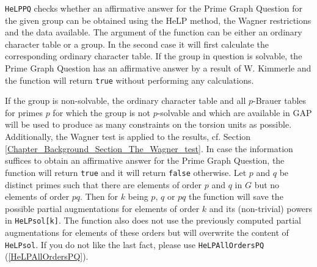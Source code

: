 \documentclass[a4paper,11pt]{report}
\begin{document}
{{{ \texttt{HeLP{\textunderscore}PQ} checks whether an affirmative answer for the Prime Graph Question for the
given group can be obtained using the HeLP method, the Wagner restrictions and
the data available. The argument of the function can be either an ordinary
character table or a group. In the second case it will first calculate the
corresponding ordinary character table. If the group in question is solvable,
the Prime Graph Question has an affirmative answer by a result of W. Kimmerle
and the function will return \texttt{true} without performing any calculations.

 If the group is non-solvable, the ordinary character table and all $p$-Brauer tables for primes $p$ for which the group is not $p$-solvable and which are available in GAP will be used to produce as many
constraints on the torsion units as possible. Additionally, the Wagner test is
applied to the results, cf. Section \ref{Chapter_Background_Section_The_Wagner_test}. In case the information suffices to obtain an affirmative answer for the
Prime Graph Question, the function will return \texttt{true} and it will return \texttt{false} otherwise. Let $p$ and $q$ be distinct primes such that there are elements of order $p$ and $q$ in $G$ but no elements of order $pq$. Then for $k$ being $p$, $q$ or $pq$ the function will save the possible partial augmentations for elements of
order $k$ and its (non-trivial) powers in \texttt{HeLP{\textunderscore}sol[k]}. The function also does not use the previously computed partial augmentations
for elements of these orders but will overwrite the content of \texttt{HeLP{\textunderscore}sol}. If you do not like the last fact, please use \texttt{HeLP{\textunderscore}AllOrdersPQ} (\ref{HeLPAllOrdersPQ}). }

}}
\end{document}
